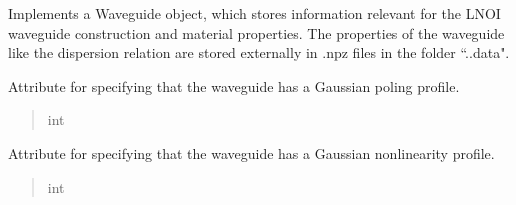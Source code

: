 \documentclass[a4paper,10pt,english]{sphinxmanual}
\begin{document}
\begin{fulllineitems}
\label{\detokenize{waveguide:pyjsa.waveguide.Waveguide}}
\pysigstartsignatures
{}
\pysigstopsignatures
\sphinxAtStartPar
Implements a Waveguide object, which stores information relevant for the LNOI waveguide construction and material properties. The properties of the waveguide like the dispersion relation are stored externally in .npz files in the folder “..data".

\begin{fulllineitems}
\label{\detokenize{waveguide:pyjsa.waveguide.Waveguide.GAUSSIAN_POLED}}
\pysigstartsignatures
{}
\pysigstopsignatures
\sphinxAtStartPar
Attribute for specifying that the waveguide has a Gaussian poling profile.
\begin{quote}\begin{description}
\sphinxAtStartPar
int

\end{description}\end{quote}

\end{fulllineitems}


\begin{fulllineitems}
\label{\detokenize{waveguide:pyjsa.waveguide.Waveguide.GAUSSIAN}}
\pysigstartsignatures
{}
\pysigstopsignatures
\sphinxAtStartPar
Attribute for specifying that the waveguide has a Gaussian nonlinearity profile.
\begin{quote}\begin{description}
\sphinxAtStartPar
int


\end{description}
\end{quote}
\end{fulllineitems}
\end{fulllineitems}
\end{document}
